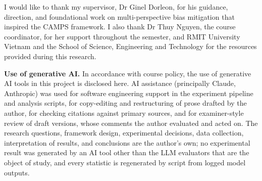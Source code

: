 I would like to thank my supervisor, Dr Ginel Dorleon, for his guidance,
direction, and foundational work on multi-perspective bias mitigation
that inspired the CAMPS framework. I also thank Dr Thuy Nguyen, the
course coordinator, for her support throughout the semester, and RMIT
University Vietnam and the School of Science, Engineering and Technology
for the resources provided during this research.

\medskip
\noindent\textbf{Use of generative AI.} In accordance with course
policy, the use of generative AI tools in this project is disclosed
here. AI assistance (principally Claude, Anthropic) was used for
software engineering support in the experiment pipeline and analysis
scripts, for copy-editing and restructuring of prose drafted by the
author, for checking citations against primary sources, and for
examiner-style review of draft versions, whose comments the author
evaluated and acted on. The research
questions, framework design, experimental decisions, data collection,
interpretation of results, and conclusions are the author's own; no
experimental result was generated by an AI tool other than the LLM
evaluators that are the object of study, and every statistic is
regenerated by script from logged model outputs.
